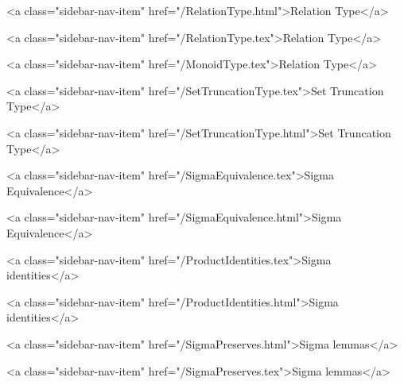       
    
      
        
          <a class="sidebar-nav-item" href="/RelationType.html">Relation Type</a>
        
      
    
      
        
          <a class="sidebar-nav-item" href="/RelationType.tex">Relation Type</a>
        
      
    
      
        
          <a class="sidebar-nav-item" href="/MonoidType.tex">Relation Type</a>
        
      
    
      
        
          <a class="sidebar-nav-item" href="/SetTruncationType.tex">Set Truncation Type</a>
        
      
    
      
        
          <a class="sidebar-nav-item" href="/SetTruncationType.html">Set Truncation Type</a>
        
      
    
      
        
          <a class="sidebar-nav-item" href="/SigmaEquivalence.tex">Sigma Equivalence</a>
        
      
    
      
        
          <a class="sidebar-nav-item" href="/SigmaEquivalence.html">Sigma Equivalence</a>
        
      
    
      
        
          <a class="sidebar-nav-item" href="/ProductIdentities.tex">Sigma identities</a>
        
      
    
      
        
          <a class="sidebar-nav-item" href="/ProductIdentities.html">Sigma identities</a>
        
      
    
      
        
          <a class="sidebar-nav-item" href="/SigmaPreserves.html">Sigma lemmas</a>
        
      
    
      
        
          <a class="sidebar-nav-item" href="/SigmaPreserves.tex">Sigma lemmas</a>
        

